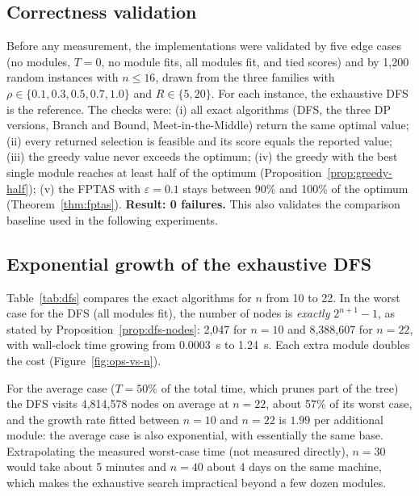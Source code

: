 \subsection{Correctness validation}\label{sec:exp-correct}

Before any measurement, the implementations were validated by five edge cases (no modules, $T=0$, no module fits, all modules fit, and tied scores) and by 1,200 random instances with $n\le16$, drawn from the three families with $\rho\in\{0.1,0.3,0.5,0.7,1.0\}$ and $R\in\{5,20\}$. For each instance, the exhaustive DFS is the reference. The checks were: (i) all exact algorithms (DFS, the three DP versions, Branch and Bound, Meet-in-the-Middle) return the same optimal value; (ii) every returned selection is feasible and its score equals the reported value; (iii) the greedy value never exceeds the optimum; (iv) the greedy with the best single module reaches at least half of the optimum (Proposition~\ref{prop:greedy-half}); (v) the FPTAS with $\varepsilon=0.1$ stays between 90\% and 100\% of the optimum (Theorem~\ref{thm:fptas}). \textbf{Result: 0 failures.} This also validates the comparison baseline used in the following experiments.

\subsection{Exponential growth of the exhaustive DFS}\label{sec:exp-dfs}

Table~\ref{tab:dfs} compares the exact algorithms for $n$ from 10 to 22. In the worst case for the DFS (all modules fit), the number of nodes is \emph{exactly} $2^{n+1}-1$, as stated by Proposition~\ref{prop:dfs-nodes}: 2,047 for $n=10$ and 8,388,607 for $n=22$, with wall-clock time growing from 0.0003~s to 1.24~s. Each extra module doubles the cost (Figure~\ref{fig:ops-vs-n}).

\begin{table}[h]
\centering
\caption{Exact algorithms for small $n$ (uncorrelated family, $R=20$). Operation counts; the average case uses five instances per size.}\label{tab:dfs}
\small

\end{table}

For the average case ($T=50\%$ of the total time, which prunes part of the tree) the DFS visits 4,814,578 nodes on average at $n=22$, about 57\% of its worst case, and the growth rate fitted between $n=10$ and $n=22$ is $1.99$ per additional module: the average case is also exponential, with essentially the same base. Extrapolating the measured worst-case time (not measured directly), $n=30$ would take about 5 minutes and $n=40$ about 4 days on the same machine, which makes the exhaustive search impractical beyond a few dozen modules.

